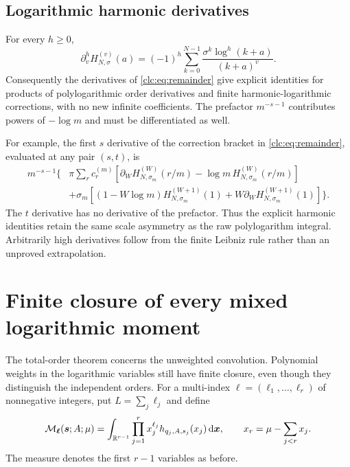\documentclass[11pt,a4paper]{article}
\numberwithin{equation}{section}
\theoremstyle{definition}\newtheorem{definition}[theorem]{Definition}
\theoremstyle{remark}\newtheorem{remark}[theorem]{Remark}
\newcommand{\dd}{\,\mathrm d}
\begin{document}
\subsection{Logarithmic harmonic derivatives}
For every $h\ge0$,
\begin{equation}\label{clc:eq:Hjets}
 \partial_v^hH_{N,\sigma}^{(v)}(a)
 =(-1)^h\sum_{k=0}^{N-1}
       \frac{\sigma^k\log^h(k+a)}{(k+a)^v}.
\end{equation}
Consequently the derivatives of \eqref{clc:eq:remainder} give explicit
identities for products of polylogarithmic order derivatives and finite
harmonic-logarithmic corrections, with no new infinite coefficients.
The prefactor $m^{-s-1}$ contributes powers of $-\log m$ and must be
differentiated as well.

For example, the first $s$ derivative of the correction bracket in
\eqref{clc:eq:remainder}, evaluated at any pair $(s,t)$, is
\begin{align*}
 m^{-s-1}\biggl\{&\pi\sum_r c_r^{(m)}
       [\partial_W H_{N,\sigma_m}^{(W)}(r/m)
                     -\log m\,H_{N,\sigma_m}^{(W)}(r/m)]\\
 &+\sigma_m[(1-W\log m)H_{N,\sigma_m}^{(W+1)}(1)
                  +W\partial_W H_{N,\sigma_m}^{(W+1)}(1)]\biggr\}.
\end{align*}
The $t$ derivative has no derivative of the prefactor. Thus the explicit
harmonic identities retain the same scale asymmetry as the raw
polylogarithm integral. Arbitrarily high derivatives follow from the
finite Leibniz rule rather than an unproved extrapolation.

\section{Finite closure of every mixed logarithmic moment}
\label{clc:sec:moments}

The total-order theorem concerns the unweighted convolution. Polynomial
weights in the logarithmic variables still have finite closure, even
though they distinguish the independent orders.
For a multi-index $\boldsymbol\ell=(\ell_1,\ldots,\ell_r)$ of
nonnegative integers, put $L=\sum_j\ell_j$ and define
\begin{equation}\label{clc:eq:M}
 \mathcal M_{\boldsymbol\ell}(\bs;A;\mu)=
 \int_{\R^{r-1}}\prod_{j=1}^r
      x_j^{\ell_j}h_{q_j,A,s_j}(x_j)\dd\boldsymbol x,
 \qquad x_r=\mu-\sum_{j<r}x_j.
\end{equation}
The measure denotes the first $r-1$ variables as before.
\end{document}
